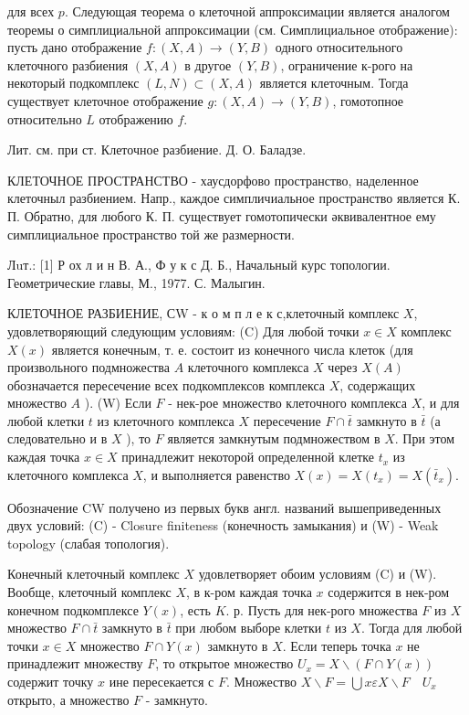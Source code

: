 \documentclass[10pt]{article}
\begin{document}
для всех $p$. Следующая теорема о клеточной аппроксимации является аналогом теоремы о симплициальной аппроксимации (см. Симплициальное отображение): пусть дано отображение $f:(X, A) \rightarrow(Y, B)$ одного относительного клеточного разбиения $(X, A)$ в другое $(Y, B)$, ограничение к-рого на некоторый подкомплекс $(L, N) \subset(X, A)$ является клеточным. Тогда существует клеточное отображение $g:(X, A) \rightarrow(Y, B)$, гомотопное относительно $L$ отображению $f$.



Лит. см. при ст. Клеточное разбиение. Д. О. Баладзе.



КЛЕТОЧНОЕ ПРОСТРАНСТВО - хаусдорфово пространство, наделенное клеточныл разбиением. Напр., каждое симпличиальное пространство является К. П. Обратно, для любого К. П. существует гомотопически әквивалентное ему симплициальное пространство той же размерности.



Лuт.: [1] Р ох л и н В. А., Ф у к с Д. Б., Начальный курс топологии. Геометрические главы, М., 1977. С. Малыгин.



КЛЕТОЧНОЕ РАЗБИЕНИЕ, СW - к о м п л е к с,клеточный комплекс $X$, удовлетворяющий следующим условиям: (C) Для любой точки $x \in X$ комплекс $X(x)$ является конечным, т. е. состоит из конечного числа клеток (для произвольного подмножества $A$ клеточного комплекса $X$ через $X(A)$ обозначается пересечение всех подкомплексов комплекса $X$, содержащих множество $A$ ). (W) Если $F$ - нек-рое множество клеточного комплекса $X$, и для любой клетки $t$ из клеточного комплекса $X$ пересечение $F \cap \bar{t}$ замкнуто в $\bar{t}$ (а следовательно и в $X$ ), то $F$ является замкнутым подмножеством в $X$. При этом каждая точка $x \in X$ принадлежит некоторой определенной клетке $t_{x}$ из клеточного комплекса $X$, и выполняется равенство $X(x)=X\left(t_{x}\right)=X\left(\bar{t}_{x}\right)$.



Обозначение $\mathrm{CW}$ получено из первых букв англ. названий вышеприведенных двух условий: (C) - Closure finiteness (конечность замыкания) и (W) - Weak topology (слабая топология).



Конечный клеточный комплекс $X$ удовлетворяет обоим условиям (C) и (W). Вообще, клеточный комплекс $X$, в к-ром каждая точка $x$ содержится в нек-ром конечном подкомплексе $Y(x)$, есть $K$. р. Пусть для нек-рого множества $F$ из $X$ множество $F \cap \bar{t}$ замкнуто в $\bar{t}$ при любом выборе клетки $t$ из $X$. Тогда для любой точки $x \in X$ множество $F \cap Y(x)$ замкнуто в $X$. Если теперь точка $x$ не принадлежит множеству $F$, то открытое множество $U_{x}=X \backslash(F \cap Y(x))$ содержит точку $x$ ине пересекается с $F$. Множество $X \backslash F=\bigcup x \varepsilon X \backslash F \quad U_{x}$ открыто, а множество $F$ - замкнуто.
\end{document}
